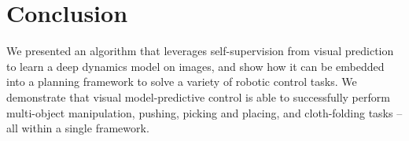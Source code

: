 \documentclass[10pt,journal,compsoc]{IEEEtran}
\begin{document}














\section{Conclusion}
We presented an algorithm that leverages self-supervision from visual prediction to learn a deep dynamics model on images, and show how it can be embedded into a  planning framework to solve a variety of robotic control tasks. We demonstrate that visual model-predictive control is able to successfully perform multi-object manipulation, pushing, picking and placing, and cloth-folding tasks -- all within a single framework. 


\end{document}
